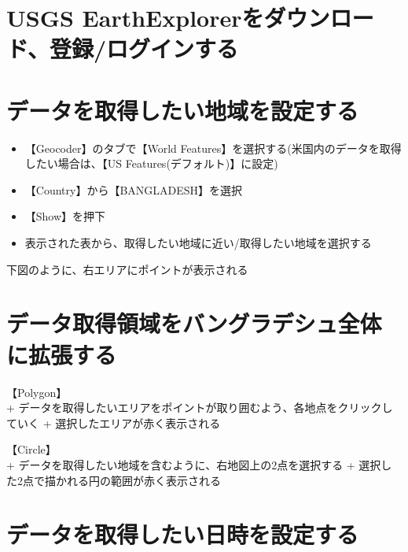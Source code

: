 \documentclass[
]{book}
\begin{document}
\hypertarget{usgs-earthexplorerux3092ux30c0ux30a6ux30f3ux30edux30fcux30c9ux767bux9332ux30edux30b0ux30a4ux30f3ux3059ux308b}{%
\section{USGS EarthExplorerをダウンロード、登録/ログインする}\label{usgs-earthexplorerux3092ux30c0ux30a6ux30f3ux30edux30fcux30c9ux767bux9332ux30edux30b0ux30a4ux30f3ux3059ux308b}}

\hypertarget{ux30c7ux30fcux30bfux3092ux53d6ux5f97ux3057ux305fux3044ux5730ux57dfux3092ux8a2dux5b9aux3059ux308b}{%
\section{データを取得したい地域を設定する}\label{ux30c7ux30fcux30bfux3092ux53d6ux5f97ux3057ux305fux3044ux5730ux57dfux3092ux8a2dux5b9aux3059ux308b}}

\begin{itemize}
\item
  【Geocoder】のタブで【World Features】を選択する(米国内のデータを取得したい場合は、【US Features(デフォルト)】に設定)
\item
  【Country】から【BANGLADESH】を選択
\item
  【Show】を押下
\item
  表示された表から、取得したい地域に近い/取得したい地域を選択する
\end{itemize}

下図のように、右エリアにポイントが表示される

\hypertarget{ux30c7ux30fcux30bfux53d6ux5f97ux9818ux57dfux3092ux30d0ux30f3ux30b0ux30e9ux30c7ux30b7ux30e5ux5168ux4f53ux306bux62e1ux5f35ux3059ux308b}{%
\section{データ取得領域をバングラデシュ全体に拡張する}\label{ux30c7ux30fcux30bfux53d6ux5f97ux9818ux57dfux3092ux30d0ux30f3ux30b0ux30e9ux30c7ux30b7ux30e5ux5168ux4f53ux306bux62e1ux5f35ux3059ux308b}}

【Polygon】\\
+ データを取得したいエリアをポイントが取り囲むよう、各地点をクリックしていく
+ 選択したエリアが赤く表示される

【Circle】\\
+ データを取得したい地域を含むように、右地図上の2点を選択する
+ 選択した2点で描かれる円の範囲が赤く表示される

\hypertarget{ux30c7ux30fcux30bfux3092ux53d6ux5f97ux3057ux305fux3044ux65e5ux6642ux3092ux8a2dux5b9aux3059ux308b}{%
\section{データを取得したい日時を設定する}\label{ux30c7ux30fcux30bfux3092ux53d6ux5f97ux3057ux305fux3044ux65e5ux6642ux3092ux8a2dux5b9aux3059ux308b}}
\end{document}
